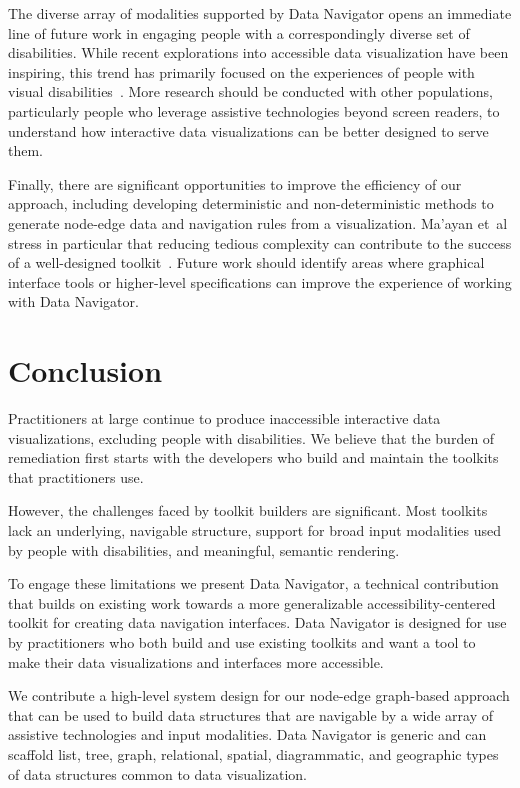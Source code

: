\documentclass[journal]{vgtc}                %
\newcommand{\ea}{{et~al\xperiod}\xspace}
\begin{document}
The diverse array of modalities supported by Data Navigator opens an immediate line of future work in engaging people with a correspondingly diverse set of disabilities. While recent explorations into accessible data visualization have been inspiring, this trend has primarily focused on the experiences of people with visual disabilities~\cite{Elavsky2022Chartability,Marriott2021Inclusive,Kim2021Accessible}. More research should be conducted with other populations, particularly people who leverage assistive technologies beyond screen readers, to understand how interactive data visualizations can be better designed to serve them.

Finally, there are significant opportunities to improve the efficiency of our approach, including developing deterministic and non-deterministic methods to generate node-edge data and navigation rules from a visualization. Ma'ayan \ea stress in particular that reducing tedious complexity can contribute to the success of a well-designed toolkit~\cite{Maayan2020Domain}. Future work should identify areas where graphical interface tools or higher-level specifications can improve the experience of working with Data Navigator.

\section{Conclusion}
Practitioners at large continue to produce inaccessible interactive data visualizations, excluding people with disabilities. We believe that the burden of remediation first starts with the developers who build and maintain the toolkits that practitioners use.

However, the challenges faced by toolkit builders are significant. Most toolkits lack an underlying, navigable structure, support for broad input modalities used by people with disabilities, and meaningful, semantic rendering.

To engage these limitations we present Data Navigator, a technical contribution that builds on existing work towards a more generalizable accessibility-centered toolkit for creating data navigation interfaces. Data Navigator is designed for use by practitioners who both build and use existing toolkits and want a tool to make their data visualizations and interfaces more accessible.

We contribute a high-level system design for our node-edge graph-based approach that can be used to build data structures that are navigable by a wide array of assistive technologies and input modalities. Data Navigator is generic and can scaffold list, tree, graph, relational, spatial, diagrammatic, and geographic types of data structures common to data visualization.
\end{document}
